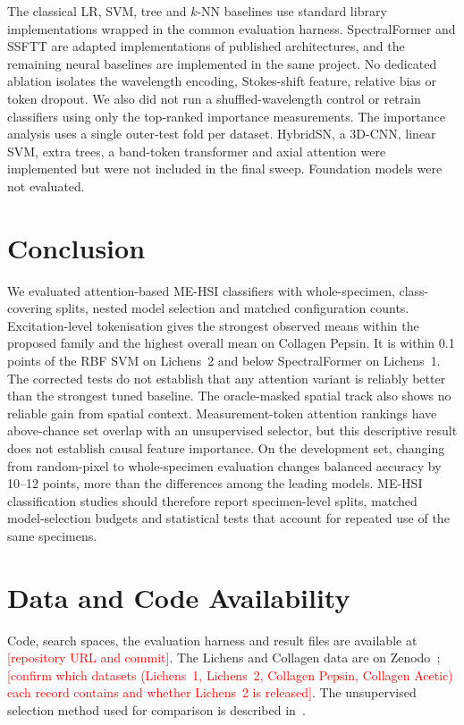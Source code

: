 \documentclass[journal]{IEEEtran}
\newcommand{\RESULT}[1]{\textcolor{red}{[#1]}}
\begin{document}
The classical LR, SVM, tree and $k$-NN baselines use standard library implementations wrapped in the common evaluation harness. SpectralFormer and SSFTT are adapted implementations of published architectures, and the remaining neural baselines are implemented in the same project. No dedicated ablation isolates the wavelength encoding, Stokes-shift feature, relative bias or token dropout. We also did not run a shuffled-wavelength control or retrain classifiers using only the top-ranked importance measurements. The importance analysis uses a single outer-test fold per dataset. HybridSN, a 3D-CNN, linear SVM, extra trees, a band-token transformer and axial attention were implemented but were not included in the final sweep. Foundation models were not evaluated.

\section{Conclusion}
We evaluated attention-based ME-HSI classifiers with whole-specimen, class-covering splits, nested model selection and matched configuration counts. Excitation-level tokenisation gives the strongest observed means within the proposed family and the highest overall mean on Collagen Pepsin. It is within 0.1 points of the RBF SVM on Lichens~2 and below SpectralFormer on Lichens~1. The corrected tests do not establish that any attention variant is reliably better than the strongest tuned baseline. The oracle-masked spatial track also shows no reliable gain from spatial context. Measurement-token attention rankings have above-chance set overlap with an unsupervised selector, but this descriptive result does not establish causal feature importance. On the development set, changing from random-pixel to whole-specimen evaluation changes balanced accuracy by 10--12 points, more than the differences among the leading models. ME-HSI classification studies should therefore report specimen-level splits, matched model-selection budgets and statistical tests that account for repeated use of the same specimens.

\section*{Data and Code Availability}
Code, search spaces, the evaluation harness and result files are available at \RESULT{repository URL and commit}. The Lichens and Collagen data are on Zenodo~\cite{zenodo_lichens,zenodo_collagen}; \RESULT{confirm which datasets (Lichens~1, Lichens~2, Collagen Pepsin, Collagen Acetic) each record contains and whether Lichens~2 is released}. The unsupervised selection method used for comparison is described in~\cite{meloyan2026unsupervised}.



\end{document}
